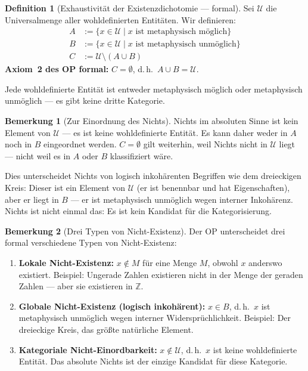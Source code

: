 \documentclass[11pt,a4paper]{article}
\theoremstyle{plain}
\theoremstyle{definition}
\newtheorem{definition}{Definition}[section]
\newtheorem{remark}{Bemerkung}[section]
\begin{document}
\begin{definition}[Exhaustivit\"{a}t der Existenzdichotomie --- formal]
Sei $\mathcal{U}$ die Universalmenge aller wohldefinierten Entit\"{a}ten. Wir
definieren:
\begin{align*}
  A &:= \{ x \in \mathcal{U} \mid x \text{ ist metaphysisch m\"{o}glich} \} \\
  B &:= \{ x \in \mathcal{U} \mid x \text{ ist metaphysisch unm\"{o}glich} \} \\
  C &:= \mathcal{U} \setminus (A \cup B)
\end{align*}
\textbf{Axiom~2 des OP formal:} $C = \emptyset$, d.\,h.\ $A \cup B = \mathcal{U}$.

Jede wohldefinierte Entit\"{a}t ist entweder metaphysisch m\"{o}glich oder
metaphysisch unm\"{o}glich --- es gibt keine dritte Kategorie.
\end{definition}

\begin{remark}[Zur Einordnung des Nichts]
\glqq{}Nichts\grqq{} im absoluten Sinne ist kein Element von $\mathcal{U}$ ---
es ist keine wohldefinierte Entit\"{a}t. Es kann daher weder in $A$ noch in $B$
eingeordnet werden. $C = \emptyset$ gilt weiterhin, weil \glqq{}Nichts\grqq{} nicht
in $\mathcal{U}$ liegt --- nicht weil es in $A$ oder $B$ klassifiziert w\"{a}re.

Dies unterscheidet \glqq{}Nichts\grqq{} von logisch inkoh\"{a}renten Begriffen wie
dem \glqq{}dreieckigen Kreis\grqq{}: Dieser ist ein Element von $\mathcal{U}$ (er
ist benennbar und hat Eigenschaften), aber er liegt in $B$ --- er ist metaphysisch
unm\"{o}glich wegen interner Inkoh\"{a}renz. \glqq{}Nichts\grqq{} ist nicht einmal
das: Es ist kein Kandidat f\"{u}r die Kategorisierung.
\end{remark}

\begin{remark}[Drei Typen von Nicht-Existenz]
Der OP unterscheidet drei formal verschiedene Typen von Nicht-Existenz:
\begin{enumerate}
  \item \textbf{Lokale Nicht-Existenz:} $x \notin M$ f\"{u}r eine Menge $M$, obwohl
        $x$ anderswo existiert. Beispiel: Ungerade Zahlen existieren nicht in der Menge
        der geraden Zahlen --- aber sie existieren in $\mathbb{Z}$.
  \item \textbf{Globale Nicht-Existenz (logisch inkoh\"{a}rent):} $x \in B$, d.\,h.\
        $x$ ist metaphysisch unm\"{o}glich wegen interner Widerspr\"{u}chlichkeit.
        Beispiel: Der dreieckige Kreis, das gr\"{o}\ss{}te nat\"{u}rliche Element.
  \item \textbf{Kategoriale Nicht-Einordbarkeit:} $x \notin \mathcal{U}$, d.\,h.\ $x$
        ist keine wohldefinierte Entit\"{a}t. Das absolute Nichts ist der einzige
        Kandidat f\"{u}r diese Kategorie.
\end{enumerate}
\end{remark}
\end{document}
